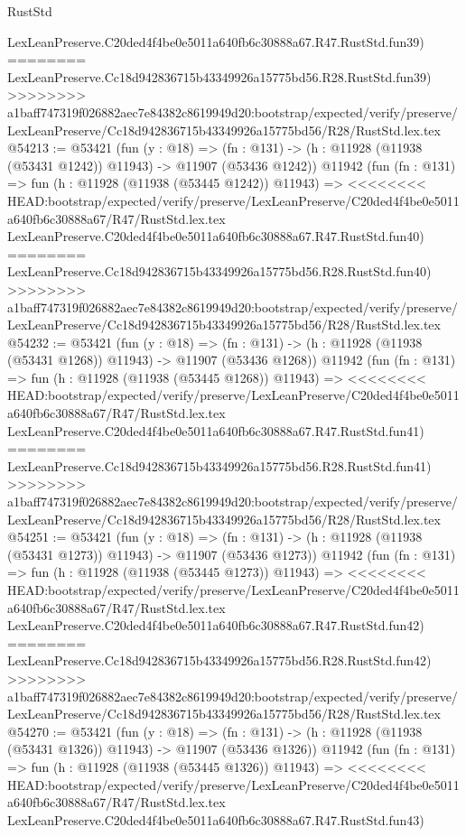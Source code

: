 \begin{lexlean}{RustStd}
\begin{coremodule}
{\begin{coremodule}
{{{{{{{{{{{{{{{{{{{{{{{{{{{{{{{{{{{{{{{{{{{{{{{{{{{{{{{{{{{{{{{{{{{{{{{{{{{{{{{{    LexLeanPreserve.C20ded4f4be0e5011a640fb6c30888a67.R47.RustStd.fun39)
========
    LexLeanPreserve.Cc18d942836715b43349926a15775bd56.R28.RustStd.fun39)
>>>>>>>> a1baff747319f026882aec7e84382c8619949d20:bootstrap/expected/verify/preserve/LexLeanPreserve/Cc18d942836715b43349926a15775bd56/R28/RustStd.lex.tex
@54213 := @53421
    (fun (y : @18) =>
    (fn : @131) -> (h : @11928 (@11938 (@53431 @1242)) @11943) -> @11907 (@53436 @1242))
    @11942
    (fun (fn : @131) =>
    fun (h : @11928 (@11938 (@53445 @1242)) @11943) =>
<<<<<<<< HEAD:bootstrap/expected/verify/preserve/LexLeanPreserve/C20ded4f4be0e5011a640fb6c30888a67/R47/RustStd.lex.tex
    LexLeanPreserve.C20ded4f4be0e5011a640fb6c30888a67.R47.RustStd.fun40)
========
    LexLeanPreserve.Cc18d942836715b43349926a15775bd56.R28.RustStd.fun40)
>>>>>>>> a1baff747319f026882aec7e84382c8619949d20:bootstrap/expected/verify/preserve/LexLeanPreserve/Cc18d942836715b43349926a15775bd56/R28/RustStd.lex.tex
@54232 := @53421
    (fun (y : @18) =>
    (fn : @131) -> (h : @11928 (@11938 (@53431 @1268)) @11943) -> @11907 (@53436 @1268))
    @11942
    (fun (fn : @131) =>
    fun (h : @11928 (@11938 (@53445 @1268)) @11943) =>
<<<<<<<< HEAD:bootstrap/expected/verify/preserve/LexLeanPreserve/C20ded4f4be0e5011a640fb6c30888a67/R47/RustStd.lex.tex
    LexLeanPreserve.C20ded4f4be0e5011a640fb6c30888a67.R47.RustStd.fun41)
========
    LexLeanPreserve.Cc18d942836715b43349926a15775bd56.R28.RustStd.fun41)
>>>>>>>> a1baff747319f026882aec7e84382c8619949d20:bootstrap/expected/verify/preserve/LexLeanPreserve/Cc18d942836715b43349926a15775bd56/R28/RustStd.lex.tex
@54251 := @53421
    (fun (y : @18) =>
    (fn : @131) -> (h : @11928 (@11938 (@53431 @1273)) @11943) -> @11907 (@53436 @1273))
    @11942
    (fun (fn : @131) =>
    fun (h : @11928 (@11938 (@53445 @1273)) @11943) =>
<<<<<<<< HEAD:bootstrap/expected/verify/preserve/LexLeanPreserve/C20ded4f4be0e5011a640fb6c30888a67/R47/RustStd.lex.tex
    LexLeanPreserve.C20ded4f4be0e5011a640fb6c30888a67.R47.RustStd.fun42)
========
    LexLeanPreserve.Cc18d942836715b43349926a15775bd56.R28.RustStd.fun42)
>>>>>>>> a1baff747319f026882aec7e84382c8619949d20:bootstrap/expected/verify/preserve/LexLeanPreserve/Cc18d942836715b43349926a15775bd56/R28/RustStd.lex.tex
@54270 := @53421
    (fun (y : @18) =>
    (fn : @131) -> (h : @11928 (@11938 (@53431 @1326)) @11943) -> @11907 (@53436 @1326))
    @11942
    (fun (fn : @131) =>
    fun (h : @11928 (@11938 (@53445 @1326)) @11943) =>
<<<<<<<< HEAD:bootstrap/expected/verify/preserve/LexLeanPreserve/C20ded4f4be0e5011a640fb6c30888a67/R47/RustStd.lex.tex
    LexLeanPreserve.C20ded4f4be0e5011a640fb6c30888a67.R47.RustStd.fun43)
}}}}}}}}}}}}}}}}}}}}}}}}}}}}}}}}}}}}}}}}}}}}}}}}}}}}}}}}}}}}}}}}}}}}}}}}}}}}}}}}
\end{coremodule}}
\end{coremodule}
\end{lexlean}
